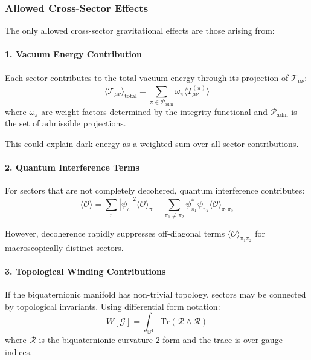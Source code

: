 \subsubsection{Allowed Cross-Sector Effects}

The only allowed cross-sector gravitational effects are those arising from:

\paragraph{1. Vacuum Energy Contribution}

Each sector contributes to the total vacuum energy through its projection of $\mathcal{T}_{\mu\nu}$:
\begin{equation}
\langle \mathcal{T}_{\mu\nu} \rangle_{\text{total}} = \sum_{\pi \in \mathcal{P}_{\text{adm}}} \omega_\pi \langle T_{\mu\nu}^{(\pi)} \rangle
\end{equation}
where $\omega_\pi$ are weight factors determined by the integrity functional and $\mathcal{P}_{\text{adm}}$ is the set of admissible projections.

This could explain dark energy as a weighted sum over all sector contributions.

\paragraph{2. Quantum Interference Terms}

For sectors that are not completely decohered, quantum interference contributes:
\begin{equation}
\langle \mathcal{O} \rangle = \sum_\pi |\psi_\pi|^2 \langle \mathcal{O} \rangle_\pi + \sum_{\pi_1 \neq \pi_2} \psi_{\pi_1}^* \psi_{\pi_2} \langle \mathcal{O} \rangle_{\pi_1\pi_2}
\end{equation}

However, decoherence rapidly suppresses off-diagonal terms $\langle \mathcal{O} \rangle_{\pi_1\pi_2}$ for macroscopically distinct sectors.

\paragraph{3. Topological Winding Contributions}

If the biquaternionic manifold has non-trivial topology, sectors may be connected by topological invariants. Using differential form notation:
\begin{equation}
W[\mathcal{G}] = \int_{\mathbb{B}^4} \text{Tr}(\mathcal{R} \wedge \mathcal{R})
\end{equation}
where $\mathcal{R}$ is the biquaternionic curvature 2-form and the trace is over gauge indices.

